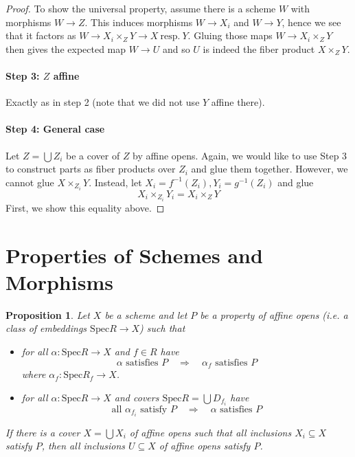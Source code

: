 \documentclass{scrartcl}
\newcommand{\Spec}{\mathrm{Spec}}
\newtheorem{prop}{Proposition}[section]
\theoremstyle{definition}
\begin{document}
\begin{proof}
    To show the universal property, assume there is a scheme $W$ with morphisms $W \to Z$.
    This induces morphisms $W \to X_i$ and $W \to Y$, hence we see that it factors as $W \to X_i \times_Z Y \to X \ \text{resp.} \ Y$.
    Gluing those maps $W \to X_i \times_Z Y$ then gives the expected map $W \to U$ and so $U$ is indeed the fiber product $X \times_Z Y$.

    \paragraph{Step 3: $Z$ affine} Exactly as in step 2 (note that we did not use $Y$ affine there).

    \paragraph{Step 4: General case} Let $Z = \bigcup Z_i$ be a cover of $Z$ by affine opens.
    Again, we would like to use Step 3 to construct parts as fiber products over $Z_i$ and glue them together.
    However, we cannot glue $X \times_{Z_i} Y$.
    Instead, let $X_i = f^{-1}(Z_i), Y_i = g^{-1}(Z_i)$ and glue
    \begin{equation*}
        X_i \times_{Z_i} Y_i = X_i \times_Z Y
    \end{equation*}
    First, we show this equality above.

\end{proof}

\section{Properties of Schemes and Morphisms}

\begin{prop}
    Let $X$ be a scheme and let $P$ be a property of affine opens (i.e. a class of embeddings $\Spec R \to X$) such that
    \begin{itemize}
        \item for all $\alpha: \Spec R \to X$ and $f \in R$ have
        \begin{equation*}
           \text{$\alpha$ satisfies $P$} \quad \Rightarrow \quad \text{$\alpha_f$ satisfies $P$}
        \end{equation*}
        where $\alpha_f: \Spec R_f \to X$.
        \item for all $\alpha: \Spec R \to X$ and covers $\Spec R = \bigcup D_{f_i}$ have
        \begin{equation*}
            \text{all $\alpha_{f_i}$ satisfy $P$} \quad \Rightarrow \quad \text{$\alpha$ satisfies $P$}
        \end{equation*}
    \end{itemize}
    If there is a cover $X = \bigcup X_i$ of affine opens such that all inclusions $X_i \subseteq X$ satisfy $P$, then all inclusions $U \subseteq X$ of affine opens satisfy $P$.
\end{prop}
\end{document}
